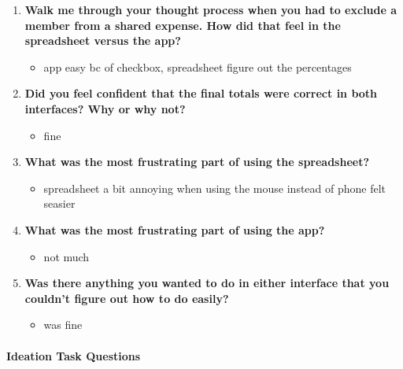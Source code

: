 \documentclass[12pt,a4paper]{article}
\begin{document}
\begin{enumerate}
    \item \textbf{Walk me through your thought process when you had to exclude a member from a shared expense. How did that feel in the spreadsheet versus the app?}
    
    \begin{itemize}
        \item app easy bc of checkbox, spreadsheet figure out the percentages
    \end{itemize}
    
    \item \textbf{Did you feel confident that the final totals were correct in both interfaces? Why or why not?}
    
    \begin{itemize}
        \item fine
    \end{itemize}
    
    \item \textbf{What was the most frustrating part of using the spreadsheet?}
    
    \begin{itemize}
        \item spreadsheet a bit annoying when using the mouse instead of phone felt seasier
    \end{itemize}
    
    \item \textbf{What was the most frustrating part of using the app?}
    
    \begin{itemize}
        \item not much
    \end{itemize}
    
    \item \textbf{Was there anything you wanted to do in either interface that you couldn't figure out how to do easily?}
    
    \begin{itemize}
        \item was fine
    \end{itemize}
\end{enumerate}

\paragraph{Ideation Task Questions}
\end{document}

